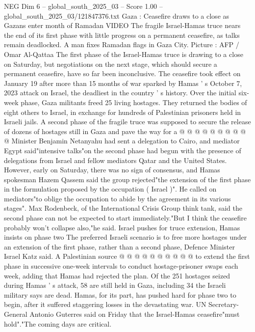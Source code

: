 \begin{textsample}{NEG Dim 6 – global\_south\_2025\_03 – Score 1.00 – global\_south\_2025\_03/121847376.txt}  \label{ex:f6_neg_223}
Gaza : Ceasefire draws to a close as Gazans enter month of Ramadan VIDEO The fragile Israel-Hamas truce nears the end of its first phase with little progress on a permanent ceasefire, as talks remain deadlocked.
A man fixes Ramadan flags in Gaza City.
Picture : AFP / Omar Al-Qattaa The first phase of the Israel-Hamas truce is drawing to a close on Saturday, but negotiations on the next stage, which should secure a permanent ceasefire, have so far been inconclusive.
The ceasefire took effect on January 19 after more than 15 months of war sparked by Hamas ' s October 7, 2023 attack on Israel, the deadliest in the country ' s history.
Over the initial six-week phase, Gaza militants freed 25 living hostages.
They returned the bodies of eight others to Israel, in exchange for hundreds of Palestinian prisoners held in Israeli jails.
A second phase of the fragile truce was supposed to secure the release of dozens of hostages still in Gaza and pave the way for a @ @ @ @ @ @ @ @ @ @ Minister Benjamin Netanyahu had sent a delegation to Cairo, and mediator Egypt said"intensive talks"on the second phase had begun with the presence of delegations from Israel and fellow mediators Qatar and the United States.
However, early on Saturday, there was no sign of consensus, and Hamas spokesman Hazem Qassem said the group rejected"the extension of the first phase in the formulation proposed by the occupation ( Israel )".
He called on mediators"to oblige the occupation to abide by the agreement in its various stages".
Max Rodenbeck, of the International Crisis Group think tank, said the second phase can not be expected to start immediately."But I think the ceasefire probably won't collapse also,"he said.
Israel pushes for truce extension, Hamas insists on phase two The preferred Israeli scenario is to free more hostages under an extension of the first phase, rather than a second phase, Defence Minister Israel Katz said.
A Palestinian source @ @ @ @ @ @ @ @ @ @ to extend the first phase in successive one-week intervals to conduct hostage-prisoner swaps each week, adding that Hamas had rejected the plan.
Of the 251 hostages seized during Hamas ' s attack, 58 are still held in Gaza, including 34 the Israeli military says are dead.
Hamas, for its part, has pushed hard for phase two to begin, after it suffered staggering losses in the devastating war.
UN Secretary-General Antonio Guterres said on Friday that the Israel-Hamas ceasefire"must hold"."The coming days are critical.

\end{textsample}
